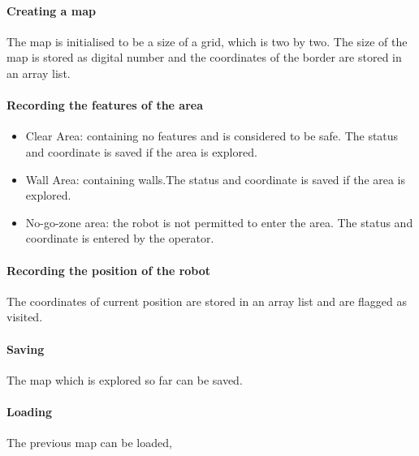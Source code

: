 \documentclass[11pt, a4paper]{report}
\begin{document}
\paragraph{Creating a map}

The map is initialised to be a size of a grid, which is two by two.
The size of the map is stored as digital number and the coordinates of the border are stored in an
array list.

\paragraph{Recording the features of the area}

\begin{itemize}
  \item  Clear Area: containing no features and is considered to be safe. The status and coordinate
   is saved if the area is explored.
\item	Wall Area: containing walls.The status and coordinate is saved if the area is explored.
\item  No-go-zone area: the robot is not permitted to enter the area. The status and coordinate is
entered by the operator.
\end{itemize}

\paragraph{Recording the position of the robot}

The coordinates of current position are stored in an array list and are flagged as visited.

\paragraph{Saving}

The map which is explored so far can be saved.

\paragraph{Loading}

The previous map can be loaded,

\end{document}
